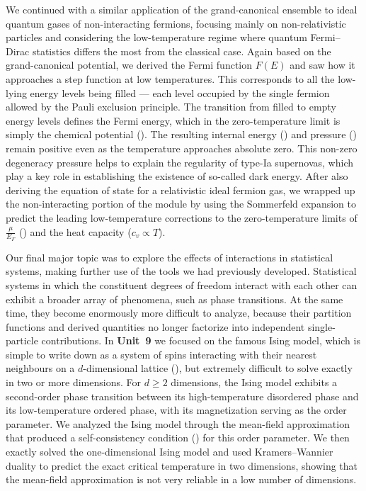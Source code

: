We continued with a similar application of the grand-canonical ensemble to ideal quantum gases of non-interacting fermions, focusing mainly on non-relativistic particles and considering the low-temperature regime where quantum Fermi--Dirac statistics differs the most from the classical case.
Again based on the grand-canonical potential, we derived the Fermi function $F(E)$ and saw how it approaches a step function at low temperatures.
This corresponds to all the low-lying energy levels being filled --- each level occupied by the single fermion allowed by the Pauli exclusion principle.
The transition from filled to empty energy levels defines the Fermi energy, which in the zero-temperature limit is simply the chemical potential ().
The resulting internal energy () and pressure () remain positive even as the temperature approaches absolute zero.
This non-zero degeneracy pressure helps to explain the regularity of type-Ia supernovas, which play a key role in establishing the existence of so-called dark energy.
After also deriving the equation of state for a relativistic ideal fermion gas, we wrapped up the non-interacting portion of the module by using the Sommerfeld expansion to predict the leading low-temperature corrections to the zero-temperature limits of $\frac{\mu}{E_F}$ () and the heat capacity ($c_v \propto T$).

Our final major topic was to explore the effects of interactions in statistical systems, making further use of the tools we had previously developed.
Statistical systems in which the constituent degrees of freedom interact with each other can exhibit a broader array of phenomena, such as phase transitions.
At the same time, they become enormously more difficult to analyze, because their partition functions and derived quantities no longer factorize into independent single-particle contributions.
In \textbf{Unit~9} we focused on the famous Ising model, which is simple to write down as a system of spins interacting with their nearest neighbours on a $d$-dimensional lattice (), but extremely difficult to solve exactly in two or more dimensions.
For $d \geq 2$ dimensions, the Ising model exhibits a second-order phase transition between its high-temperature disordered phase and its low-temperature ordered phase, with its magnetization serving as the order parameter.
We analyzed the Ising model through the mean-field approximation that produced a self-consistency condition () for this order parameter.
We then exactly solved the one-dimensional Ising model and used Kramers--Wannier duality to predict the exact critical temperature in two dimensions, showing that the mean-field approximation is not very reliable in a low number of dimensions.

